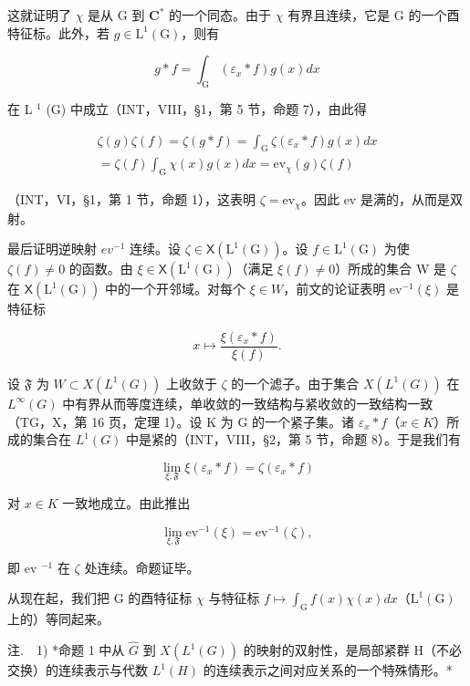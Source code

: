 这就证明了 \(\chi\) 是从 G 到 \(\mathbf{C}^*\) 的一个同态。由于 \(\chi\) 有界且连续，它是 G 的一个酉特征标。此外，若 \(g \in \mathrm{L}^{1}(\mathrm{G})\)，则有

\[
g * f = \int_ {\mathrm{G}} (\varepsilon_ {x} * f) g (x) d x
\]

在 L \(^{1}\) (G) 中成立（INT，VIII，§1，第 5 节，命题 7），由此得

\[
\begin{array}{c} \zeta (g) \zeta (f) = \zeta (g * f) = \int_ {\mathrm{G}} \zeta (\varepsilon_ {x} * f) g (x) d x \\ = \zeta (f) \int_ {\mathrm{G}} \chi (x) g (x) d x = \mathrm{ev} _ {\chi} (g) \zeta (f) \end{array}
\]

（INT，VI，§1，第 1 节，命题 1），这表明 \(\zeta = \mathrm{ev}_{\chi}\)。因此 ev 是满的，从而是双射。

最后证明逆映射 \(ev^{-1}\) 连续。设 \(\zeta \in \mathsf{X}(\mathrm{L}^{1}(\mathrm{G}))\)。设 \(f \in \mathrm{L}^{1}(\mathrm{G})\) 为使 \(\zeta(f) \neq 0\) 的函数。由 \(\xi \in \mathsf{X}(\mathrm{L}^{1}(\mathrm{G}))\)（满足 \(\xi(f) \neq 0\)）所成的集合 W 是 \(\zeta\) 在 \(\mathsf{X}(\mathrm{L}^{1}(\mathrm{G}))\) 中的一个开邻域。对每个 \(\xi \in W\)，前文的论证表明 \(\mathrm{ev}^{-1}(\xi)\) 是特征标

\[
x \mapsto \frac {\xi (\varepsilon_ {x} * f)}{\xi (f)}.
\]

设 \(\mathfrak{F}\) 为 \(W \subset X(L^{1}(G))\) 上收敛于 \(\zeta\) 的一个滤子。由于集合 \(X(L^{1}(G))\) 在 \(L^{\infty}(G)\) 中有界从而等度连续，单收敛的一致结构与紧收敛的一致结构一致（TG，X，第 16 页，定理 1）。设 K 为 G 的一个紧子集。诸 \(\varepsilon_{x} * f\)（\(x \in K\)）所成的集合在 \(L^{1}(G)\) 中是紧的（INT，VIII，§2，第 5 节，命题 8）。于是我们有

\[
\lim _ {\xi , \mathfrak {F}} \xi (\varepsilon_ {x} * f) = \zeta (\varepsilon_ {x} * f)
\]

对 \(x \in K\) 一致地成立。由此推出

\[
\lim _ {\xi , \mathfrak {F}} \mathrm{ev} ^ {- 1} (\xi) = \mathrm{ev} ^ {- 1} (\zeta),
\]

即 ev \(^{-1}\) 在 \(\zeta\) 处连续。命题证毕。

从现在起，我们把 G 的酉特征标 \(\chi\) 与特征标 \(f\mapsto\int_{\mathrm{G}}f(x)\chi(x)dx\)（\(\mathrm{L}^{1}(\mathrm{G})\) 上的）等同起来。

注.　1) *命题 1 中从 \(\widehat{G}\) 到 \(X(L^{1}(G))\) 的映射的双射性，是局部紧群 H（不必交换）的连续表示与代数 \(L^{1}(H)\) 的连续表示之间对应关系的一个特殊情形。*

